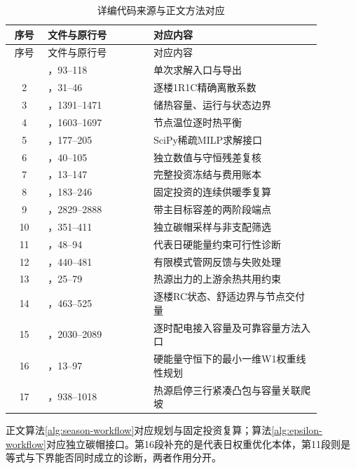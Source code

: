 \begin{longtable}{@{}cL{0.34\linewidth}L{0.54\linewidth}@{}}
\caption{详编代码来源与正文方法对应}\label{tab:code-index-a4}\\
\toprule
序号 & 文件与原行号 & 对应内容\\\midrule
\endfirsthead
\toprule 序号 & 文件与原行号 & 对应内容\\\midrule
\endhead
\bottomrule{} & ，93--118 & 单次求解入口与导出\\
2 & ，31--46 & 逐楼1R1C精确离散系数\\
3 & ，1391--1471 & 储热容量、运行与状态边界\\
4 & ，1603--1697 & 节点温位逐时热平衡\\
5 & ，177--205 & SciPy稀疏MILP求解接口\\
6 & ，40--105 & 独立数值与守恒残差复核\\
7 & ，13--147 & 完整投资冻结与费用账本\\
8 & ，183--246 & 固定投资的连续供暖季复算\\
9 & ，2829--2888 & 带主目标容差的两阶段端点\\
10 & ，351--411 & 独立碳帽采样与非支配筛选\\
11 & ，48--94 & 代表日硬能量约束可行性诊断\\
12 & ，440--481 & 有限模式管网反馈与失败处理\\
13 & ，25--79 & 热源出力的上游余热共用约束\\
14 & ，463--525 & 逐楼RC状态、舒适边界与节点交付量\\
15 & ，2030--2089 & 逐时配电接入容量及可靠容量方法入口\\
16 & ，13--97 & 硬能量守恒下的最小一维W1权重线性规划\\
17 & ，938--1018 & 热源启停三行紧凑凸包与容量关联爬坡\\
\end{longtable}

正文算法\ref{alg:season-workflow}对应规划与固定投资复算；算法\ref{alg:epsilon-workflow}对应独立碳帽接口。第16段补充的是代表日权重优化本体，第11段则是等式与下界能否同时成立的诊断，两者作用分开。

